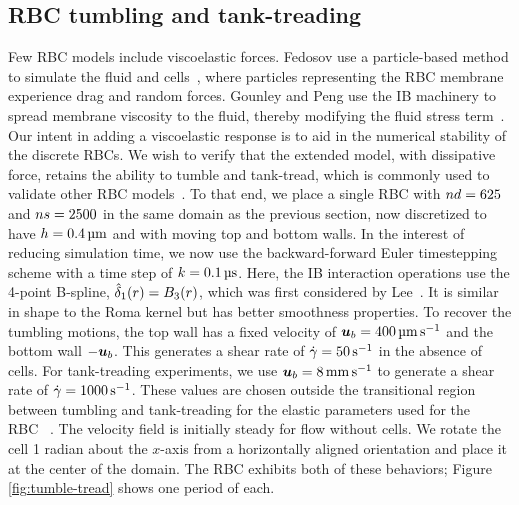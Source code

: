 \subsection{RBC tumbling and tank-treading}

Few RBC models include viscoelastic forces. Fedosov  use a particle-based
method to simulate the fluid and cells~\cite{Fedosov:2010bc}, where particles
representing the RBC membrane experience drag and random forces. Gounley and Peng use the
IB machinery to spread membrane viscosity to the fluid, thereby modifying the fluid
stress term~\cite{Gounley:2015ho}. Our intent in adding a viscoelastic response is to aid
in the numerical stability of the discrete RBCs. We wish to verify that the extended
model, with dissipative force, retains the ability to tumble and tank-tread, which is
commonly used to validate other RBC models~\cite{Yazdani:2011cl,Omori:2012hw,Fai:2013do,
Xu:2013kk}. To that end, we place a single RBC with $\data\cardinality=625$ and
$\sample\cardinality = 2500$ in the same domain as the previous section, now discretized
to have $h = 0.4\um$ and with moving top and bottom walls. In the interest of reducing
simulation time, we now use the backward-forward Euler timestepping scheme with a time
step of $\timestep=0.1\us$. Here, the IB interaction operations use the 4-point B-spline,
$\hat{\delta}_1(r) = B_3(r)$, which was first considered by Lee~\cite{Lee:2020tf}. It is similar
in shape to the Roma kernel but has better smoothness properties. To recover the tumbling
motions, the top wall has a fixed velocity of $\u_b=400\umpersec$ and the bottom wall
$-\boldsymbol{u}_b$. This generates a shear rate of $\shear=50\persec$ in the absence of cells. For
tank-treading experiments, we use $\u_b = 8\mmpersec$ to generate a shear rate of
$\shear=1000\persec$. These values are chosen outside the transitional region between
tumbling and tank-treading for the elastic parameters used for the RBC~%
\cite{Kruger:2013ji}. The velocity field is initially steady for flow without cells. We
rotate the cell 1 radian about the $x$-axis from a horizontally aligned orientation and
place it at the center of the domain. The RBC exhibits both of these behaviors; Figure~%
\ref{fig:tumble-tread} shows one period of each.

